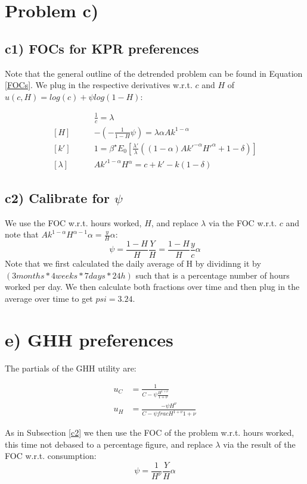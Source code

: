 \documentclass[10pt,letter]{article}
\begin{document}
\section*{Problem c)}
\subsection*{c1) FOCs for KPR preferences}
Note that the general outline of the detrended problem can be found in Equation \eqref{FOCs}. We plug in the respective derivatives w.r.t. $c$ and $H$ of $u(c,H)=log(c)+\psi log(1-H)$:

\begin{align*}
[c]\qquad& \frac{1}{c} = \lambda \\
[H]\qquad& -(-\frac{1}{1-H}\psi) = \lambda \alpha A k^{1-\alpha} \\
[k']\qquad& 1 = \beta^\star E_0\left[ \frac{\lambda'}{\lambda} \left( (1-\alpha) Ak'^{-\alpha} H'^{\alpha} + 1-\delta \right) \right]\\
[\lambda]\qquad& Ak'^{1-\alpha} H^\alpha  = c+k'-k(1-\delta)
\end{align*}

\subsection*{c2) Calibrate for $\psi$} \label{c2}
We use the FOC w.r.t. hours worked, $H$, and replace $\lambda$ via the FOC w.r.t. $c$ and note that $Ak^{1-\alpha} H^{\alpha-1}\alpha = \frac{y}{H}\alpha$:
$$\psi = \frac{1-H}{H}\frac{Y}{H} = \frac{1-H}{H}\frac{y}{c}\alpha$$
Note that we first calculated the daily average of H by dividinng it by $(3months*4weeks*7days*24h)$ such that is a percentage number of hours worked per day. We then calculate both fractions over time and then plug in the average over time to get $psi = 3.24$.

\section*{e) GHH preferences}
The partials of the GHH utility are:

\begin{align*}
u_C& = \frac{1}{C-\psi\frac{H^{1+\nu}}{1+\nu}}\\
u_H& = \frac{-\psi H^\nu}{C-\psi frac{H^{1+\nu}}{1+\nu}}
\end{align*}

As in Subsection \ref{c2} we then use the FOC of the problem w.r.t. hours worked, this time not debased to a percentage figure, and replace $\lambda$ via the result of the FOC w.r.t. consumption:
$$\psi = \frac{1}{H^\nu}\frac{Y}{H} \alpha$$
\end{document}
